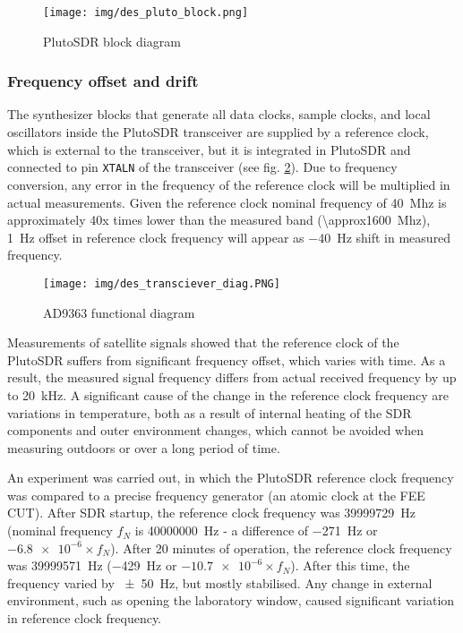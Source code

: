 \begin{figure}
    \centering
    \texttt{[image: img/des\_pluto\_block.png]}
    \caption{PlutoSDR block diagram\cite{des05}}
    \label{f_des_pluto_block}
\end{figure}

\subsubsection{Frequency offset and drift}

The synthesizer blocks that generate all data clocks, sample clocks, and local oscillators inside the PlutoSDR transceiver are supplied by a reference clock, which is external to the transceiver, but it is integrated in PlutoSDR and connected to pin \texttt{XTALN} of the transceiver (see fig. \ref{f_des_transciever_diag})\cite{des07}. Due to frequency conversion, any error in the frequency of the reference clock will be multiplied in actual measurements. Given the reference clock nominal frequency of \qty{40}{Mhz} is approximately 40x times lower than the measured band (\qty{\approx1600}{Mhz}), \qty{1}{Hz} offset in reference clock frequency will appear as \qty{-40}{Hz} shift in measured frequency.

\begin{figure}
    \centering
    \texttt{[image: img/des\_transciever\_diag.PNG]}
    \caption{AD9363 functional diagram\cite{des07}}
    \label{f_des_transciever_diag}
\end{figure}

Measurements of satellite signals showed that the reference clock of the PlutoSDR suffers from significant frequency offset, which varies with time. As a result, the measured signal frequency differs from actual received frequency by up to \qty{20}{kHz}. A significant cause of the change in the reference clock frequency are variations in temperature, both as a result of internal heating of the SDR components and outer environment changes, which cannot be avoided when measuring outdoors or over a long period of time.

An experiment was carried out, in which the PlutoSDR reference clock frequency was compared to a precise frequency generator (an atomic clock at the FEE CUT). After SDR startup, the reference clock frequency was \qty{39999729}{Hz} (nominal frequency  $f_N$ is \qty{40000000}{Hz} - a difference of \qty{-271}{Hz} or $\num{-6.8e-6} \times f_N$). After 20 minutes of operation, the reference clock frequency was  \qty{39999571}{Hz} (\qty{-429}{Hz} or $\num{-10.7e-6} \times f_N$). After this time, the frequency varied by \qty{\pm 50}{Hz}, but mostly stabilised. Any change in external environment, such as opening the laboratory window, caused significant variation in reference clock frequency.

